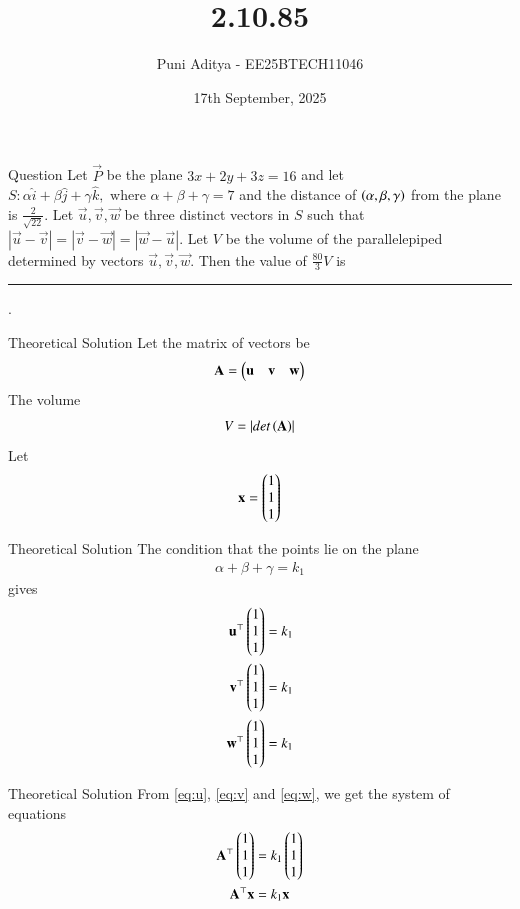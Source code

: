 \documentclass{beamer}
\title{2.10.85}
\date{17th September, 2025}
\author{Puni Aditya - EE25BTECH11046}
\begin{document}
\frame{\titlepage}
\begin{frame}{Question}
Let $\vec{P}$ be the plane $3x + 2y + 3z = 16$ and let 
$S : \alpha \hat{i} + \beta \hat{j} + \gamma \hat{k},\text{ where } \alpha + \beta + \gamma = 7$
and the distance of $\left(\alpha, \beta, \gamma\right)$ from the plane is $\frac{2}{\sqrt{22}}$.
Let $\vec{u}, \vec{v}, \vec{w}$ be three distinct vectors in $S$ such that $|\vec{u} - \vec{v}| = |\vec{v} - \vec{w}| = |\vec{w} - \vec{u}|$. Let $V$ be the volume of the parallelepiped determined by vectors $\vec{u}, \vec{v}, \vec{w}$. Then the value of $\frac{80}{3} V$ is
\rule{1cm}{0.1pt}.
\end{frame}

\begin{frame}{Theoretical Solution}
Let the matrix of vectors be 
\begin{align}
	\mathbf{A} = \begin{pmatrix}\mathbf{u} & \mathbf{v} & \mathbf{w}\end{pmatrix}
\end{align}
The volume 
\begin{align}
V = \left\vert det\left(\mathbf{A}\right)\right\vert
\end{align}
Let 
\begin{align*}
\mathbf{x} = \begin{pmatrix}1 \\ 1 \\ 1\end{pmatrix}
\end{align*}
\end{frame}

\begin{frame}{Theoretical Solution}
The condition that the points lie on the plane 
\begin{align}
	\alpha+\beta+\gamma=k_1
\end{align} gives
\begin{align}
	\mathbf{u}^\top\begin{pmatrix}1 \\ 1 \\ 1\end{pmatrix} &= k_1 \label{eq:u} \\
	\mathbf{v}^\top\begin{pmatrix}1 \\ 1 \\ 1\end{pmatrix} &= k_1 \label{eq:v} \\
	\mathbf{w}^\top\begin{pmatrix}1 \\ 1 \\ 1\end{pmatrix} &= k_1 \label{eq:w}
\end{align}
\end{frame}

\begin{frame}{Theoretical Solution}
From \eqref{eq:u}, \eqref{eq:v} and \eqref{eq:w}, we get the system of equations
\begin{align}
    \mathbf{A}^\top\begin{pmatrix}1 \\ 1 \\ 1\end{pmatrix} &= k_1\begin{pmatrix}1 \\ 1 \\ 1\end{pmatrix} \\
    \mathbf{A}^\top\mathbf{x} &= k_1\mathbf{x} \label{eq:eigen}
\end{align}
\end{frame}
\end{document}
